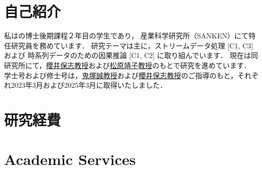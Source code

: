 \documentclass[9pt,a4paper]{article}
\begin{document}

\vspace{-1.0em}


\vspace{-1.5em}

\section{自己紹介}
  \vspace{1.0em}
  私は\OU の博士後期課程２年目の学生であり，
  産業科学研究所（SANKEN）にて特任研究員を務めています．
  研究テーマは主に，ストリームデータ処理 [C1, C3] および
  時系列データのための因果推論 [C1, C2] に取り組んでいます．
  現在は同研究所にて，\href{\YSakuraiURL}{櫻井保志教授}および\href{\YMatsubaraURL}{松原靖子教授}のもとで研究を進めています．
  学士号および修士号は，\href{\MOnizukaURL}{鬼塚誠教授}および\href{\YSakuraiURL}{櫻井保志教授}のご指導のもと，それぞれ2023年3月および2025年3月に取得いたしました．
  \vspace{0.2em}
  \\
  

\section{\Education}
  

\section{\Experience}
  

\section{\Awards}
  

\section{研究経費}

\begin{EntriesTableRight}
\end{EntriesTableRight}

\section{\Publications}
  

\section{Academic Services}
  
\end{document}
